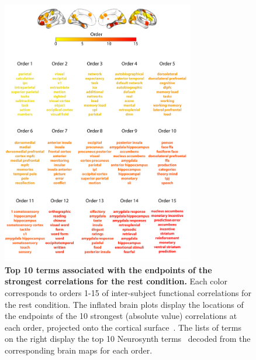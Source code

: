 \documentclass{article}
\begin{document}
\begin{figure}[p!]
\centering
\includegraphics[width=0.75\textwidth]{figs/supp_15_rest}
\caption{\textbf{Top 10 terms associated with the endpoints of the
      strongest correlations for the rest condition.}  Each color corresponds to orders 1-15 of
    inter-subject functional correlations for the rest condition. The inflated brain plots
    display the locations of the endpoints of the 10 strongest
    (absolute value) correlations at each order, projected onto the
    cortical surface~\citep{CombEtal19}.  The lists of terms on the
    right display the top 10 Neurosynth terms~\citep{RubiEtal17}
    decoded from the corresponding brain maps for each order.}
\label{fig:rest}
\end{figure}






\newpage
\renewcommand{\refname}{Supplemental references}

\end{document}
